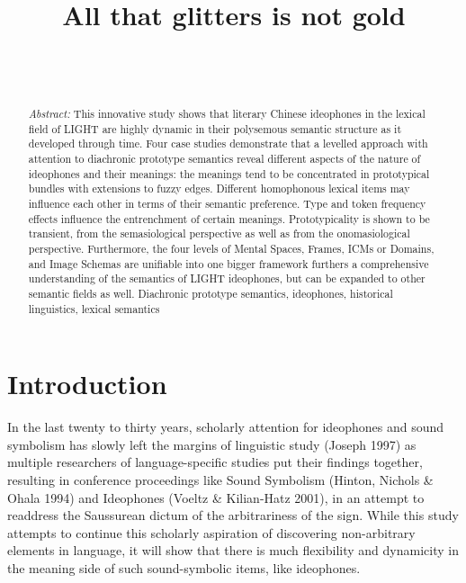 \documentclass[12pt,article,oneside]{memoir}
\title{\bigskip \bigskip All that glitters is not gold }
\author{\Large  \vspace{0.05in} \small \protect\\ \emph{} \footnotesize \protect\\  }
\date{}
\theoremstyle{definition}
\theoremstyle{definition}
\theoremstyle{definition}
\theoremstyle{remark}
\begin{document}

\maketitle


\begin{abstract}
\vspace*{-0.75in}\noindent \emph{Abstract:} This innovative study shows that literary Chinese ideophones in the
lexical field of LIGHT are highly dynamic in their polysemous semantic
structure as it developed through time. Four case studies demonstrate
that a levelled approach with attention to diachronic prototype
semantics reveal different aspects of the nature of ideophones and their
meanings: the meanings tend to be concentrated in prototypical bundles
with extensions to fuzzy edges. Different homophonous lexical items may
influence each other in terms of their semantic preference. Type and
token frequency effects influence the entrenchment of certain meanings.
Prototypicality is shown to be transient, from the semasiological
perspective as well as from the onomasiological perspective.
Furthermore, the four levels of Mental Spaces, Frames, ICMs or Domains,
and Image Schemas are unifiable into one bigger framework furthers a
comprehensive understanding of the semantics of LIGHT ideophones, but
can be expanded to other semantic fields as well.
Diachronic prototype semantics, ideophones, historical linguistics,
lexical semantics
\end{abstract}

\section{Introduction}\label{introduction}

In the last twenty to thirty years, scholarly attention for ideophones
and sound symbolism has slowly left the margins of linguistic study
(Joseph 1997) as multiple researchers of language-specific studies put
their findings together, resulting in conference proceedings like Sound
Symbolism (Hinton, Nichols \& Ohala 1994) and Ideophones (Voeltz \&
Kilian-Hatz 2001), in an attempt to readdress the Saussurean dictum of
the arbitrariness of the sign. While this study attempts to continue
this scholarly aspiration of discovering non-arbitrary elements in
language, it will show that there is much flexibility and dynamicity in
the meaning side of such sound-symbolic items, like ideophones.
\end{document}
